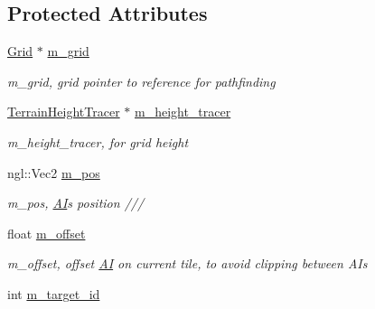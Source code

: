 \subsection*{Protected Attributes}
\begin{DoxyCompactItemize}
\item 
\hypertarget{class_a_i_a5579c03c5cb1dafb02822b8a8502ef49}{}\hyperlink{class_grid}{Grid} $\ast$ \hyperlink{class_a_i_a5579c03c5cb1dafb02822b8a8502ef49}{m\+\_\+grid}\label{class_a_i_a5579c03c5cb1dafb02822b8a8502ef49}

\begin{DoxyCompactList}\small\item\em m\+\_\+grid, grid pointer to reference for pathfinding \end{DoxyCompactList}\item 
\hypertarget{class_a_i_afd437cd4e6ff0da1adb5c27d852ee60a}{}\hyperlink{class_terrain_height_tracer}{Terrain\+Height\+Tracer} $\ast$ \hyperlink{class_a_i_afd437cd4e6ff0da1adb5c27d852ee60a}{m\+\_\+height\+\_\+tracer}\label{class_a_i_afd437cd4e6ff0da1adb5c27d852ee60a}

\begin{DoxyCompactList}\small\item\em m\+\_\+height\+\_\+tracer, for grid height \end{DoxyCompactList}\item 
\hypertarget{class_a_i_a2bddebe59cace08a8832d4d3c7162676}{}ngl\+::\+Vec2 \hyperlink{class_a_i_a2bddebe59cace08a8832d4d3c7162676}{m\+\_\+pos}\label{class_a_i_a2bddebe59cace08a8832d4d3c7162676}

\begin{DoxyCompactList}\small\item\em m\+\_\+pos, \hyperlink{class_a_i}{A\+I}\textquotesingle{}s position /// \end{DoxyCompactList}\item 
\hypertarget{class_a_i_a7f112045e81aabb5226ce5d2257555ac}{}float \hyperlink{class_a_i_a7f112045e81aabb5226ce5d2257555ac}{m\+\_\+offset}\label{class_a_i_a7f112045e81aabb5226ce5d2257555ac}

\begin{DoxyCompactList}\small\item\em m\+\_\+offset, offset \hyperlink{class_a_i}{A\+I} on current tile, to avoid clipping between A\+Is \end{DoxyCompactList}\item 
\hypertarget{class_a_i_a97f4e8721ae67e58432682764377466e}{}int \hyperlink{class_a_i_a97f4e8721ae67e58432682764377466e}{m\+\_\+target\+\_\+id}\label{class_a_i_a97f4e8721ae67e58432682764377466e}


\end{DoxyCompactItemize}
